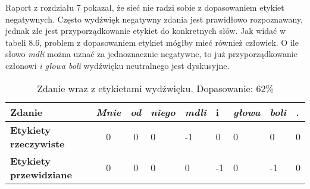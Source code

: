 Raport z rozdziału 7 pokazał, że sieć nie radzi sobie z dopasowaniem etykiet negatywnych. Często wydźwięk negatywny zdania jest prawidłowo rozpoznawany, jednak złe jest przyporządkowanie etykiet do konkretnych słów. Jak widać w tabeli 8.6, problem z dopasowaniem etykiet mógłby mieć również człowiek. O ile słowo \textit{mdli} można uznać za jednoznacznie negatywne, to już przyporządkowanie członowi \textit{i głowa boli} wydźwięku neutralnego jest dyskusyjne. 

\begin{table}[H]
\centering
\begin{tabular}{|l|c|c|l|l|l|l|l|l|}
\hline
\textbf{Zdanie}                & \textit{Mnie} & \textit{od} & \textit{niego} & \textit{mdli} & i  & \textit{głowa} & \textit{boli} & \textit{.} \\ \hline
\textbf{Etykiety rzeczywiste}  & 0             & 0           & 0              & -1            & 0  & 0              & 0             & 0          \\ \hline
\textbf{Etykiety przewidziane} & 0             & 0           & 0              & 0             & -1 & 0              & -1            & 0          \\ \hline
\end{tabular}
\caption{Zdanie wraz z etykietami wydźwięku. Dopasowanie: 62\%}
\end{table}
